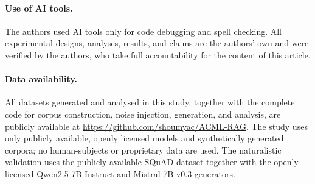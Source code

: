 \documentclass[sn-basic]{sn-jnl}
\theoremstyle{thmstyleone}
\theoremstyle{thmstyletwo}
\begin{document}
\paragraph{Use of AI tools.} The authors used AI tools only for code
debugging and spell checking. All experimental designs, analyses, results,
and claims are the authors' own and were verified by the authors, who take
full accountability for the content of this article.

\paragraph{Data availability.} All datasets generated and analysed in this
study, together with the complete code for corpus construction, noise
injection, generation, and analysis, are publicly available at
\url{https://github.com/shoumyac/ACML-RAG}. The
study uses only publicly available, openly licensed models and synthetically
generated corpora; no human-subjects or proprietary data are used. The
naturalistic validation uses the publicly available SQuAD dataset together
with the openly licensed Qwen2.5-7B-Instruct and Mistral-7B-v0.3 generators.


\end{document}
